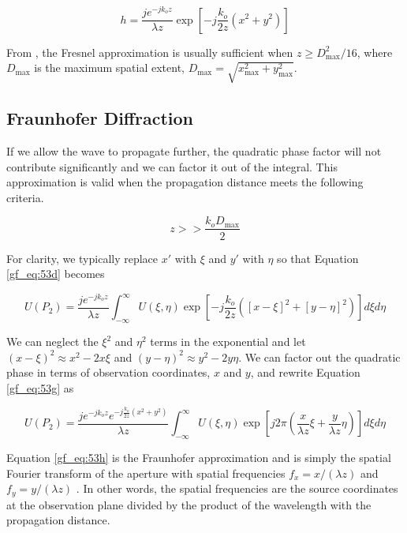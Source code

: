 \begin{equation}
h = \frac{je^{-jk_o z}}{\lambda z}\exp\left[-j\frac{k_o}{2z}\left(x^2 + y^2 \right) \right]
\label{gf_eq:53e}
\end{equation}
\renewcommand{\baselinestretch}{2} \small\normalsize

From \cite{goodman_fourier}, the Fresnel approximation is usually sufficient when $z\geq D_{\text{max}}^2/16$, where $D_{\text{max}}$ is the maximum spatial extent, $D_{\text{max}} = \sqrt{x_{\text{max}}^2 + y_{\text{max}}^2}$. 

\subsection{Fraunhofer Diffraction}
If we allow the wave to propagate further, the quadratic phase factor will not contribute significantly and we can factor it out of the integral. This approximation is valid when the propagation distance meets the following criteria.

\begin{equation}
z >> \frac{k_oD_{\text{max}}}{2}
\label{gf_eq:53f}
\end{equation}
\renewcommand{\baselinestretch}{2} \small\normalsize

For clarity, we typically replace $x'$ with $\xi$ and $y'$ with $\eta$ so that Equation \ref{gf_eq:53d} becomes

\begin{equation}
U(P_2) =\frac{je^{-jk_oz}}{\lambda z}\int_{-\infty}^{\infty} U(\xi,\eta)\exp\left[-j \frac{k_o}{2z}\left([x-\xi]^2 + [y-\eta]^2 \right) \right]d\xi d\eta
\label{gf_eq:53g}
\end{equation}
\renewcommand{\baselinestretch}{2} \small\normalsize

We can neglect the $\xi^2$ and $\eta^2$ terms in the exponential and let $(x-\xi)^2 \approx x^2-2x\xi$ and $(y-\eta)^2\approx y^2-2y\eta$. We can factor out the quadratic phase in terms of observation coordinates, $x$ and $y$, and rewrite Equation \ref{gf_eq:53g} as

\begin{equation}
\boxed{U(P_2) =\frac{je^{-jk_oz}e^{-j\frac{k_o}{2z}(x^2+y^2)}}{\lambda z}\int_{-\infty}^{\infty} U(\xi,\eta)\exp\left[j2\pi \left(\frac{x}{\lambda z}\xi + \frac{y}{\lambda z}\eta \right) \right]d\xi d\eta}
\label{gf_eq:53h}
\end{equation}
\renewcommand{\baselinestretch}{2} \small\normalsize

Equation \ref{gf_eq:53h} is the Fraunhofer approximation and is simply the spatial Fourier transform of the aperture with spatial frequencies $f_x = x/(\lambda z)$ and $f_y = y/(\lambda z)$ \cite{goodman_fourier} \cite{gaskill_fourier}. In other words, the spatial frequencies are the source coordinates at the observation plane divided by the product of the wavelength with the propagation distance.

